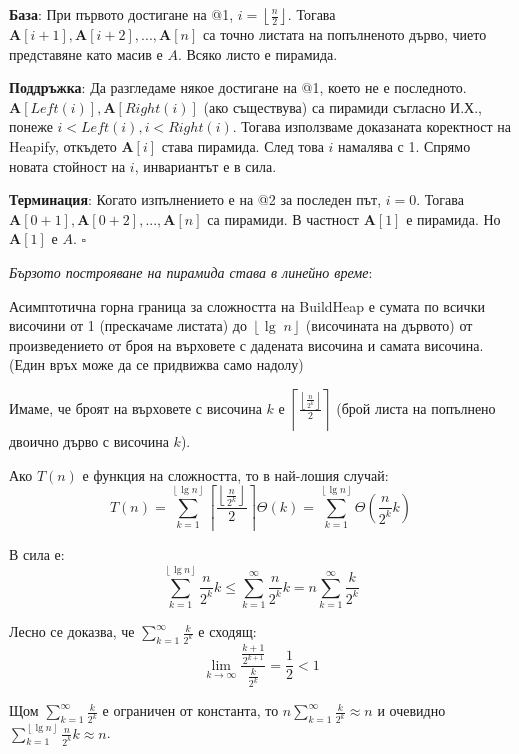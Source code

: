 \documentclass{article}
\renewcommand{\\}{\newline}
\newcommand{\proven}{\hfill $\square$}
\begin{document}
\textbf{База}: При първото достигане на @1, \(i = \left\lfloor \frac{n}{2}\right\rfloor\). Тогава \(\textbf{A}[i + 1], \textbf{A}[i+2], ..., \textbf{A}[n]\)  са точно листата на попълненото дърво, чието представяне като масив е \(A\). Всяко листо е пирамида.

\textbf{Поддръжка}: Да разгледаме някое достигане на @1, което не е последното. \(\textbf{A}[Left(i)], \textbf{A}[Right(i)]\) (ако съществува) са пирамиди съгласно И.Х., понеже \(i < Left(i), i < Right(i)\). Тогава използваме доказаната коректност на Heapify, откъдето \(\textbf{A}[i]\) става пирамида. След това \(i\) намалява с 1. Спрямо новата стойност на \(i\), инвариантът е в сила.

\textbf{Терминация}: Когато изпълнението е на @2 за последен път, \(i = 0\). Тогава \(\textbf{A}[0+1], \textbf{A}[0 + 2], ..., \textbf{A}[n]\) са пирамиди. В частност \(\textbf{A}[1]\) е пирамида. Но \(\textbf{A}[1]\) е \(A\). \proven

\textit{Бързото построяване на пирамида става в линейно време}: 

Асимптотична горна граница за сложността на BuildHeap е сумата по всички височини от 1 (прескачаме листата) до \(\left\lfloor \lg\;n\right\rfloor\) (височината на дървото) от произведението от броя на върховете с дадената височина и самата височина. (Един връх може да се придвижва само надолу)

Имаме, че броят на върховете с височина \(k\) е \(\left\lceil \frac{\left\lfloor \frac{n}{2^{k}}\right\rfloor}{2}\right\rceil\) (брой листа на попълнено двоично дърво с височина \(k\)). 

Ако \(T(n)\) е функция на сложността, то в най-лошия случай: \[
  T(n) = \sum_{k = 1}^{\left\lfloor \lg n\right\rfloor}\left\lceil \frac{\left\lfloor \frac{n}{2^{k}}\right\rfloor}{2}\right\rceil \Theta(k) = \sum_{k = 1}^{\left\lfloor \lg n\right\rfloor}\Theta \left(\frac{n}{2^{k}}k\right)
\]  

В сила е: \[
  \sum_{k=1}^{\left\lfloor \lg n\right\rfloor} \frac{n }{2^{k}}k \leq \sum_{k=1}^{\infty}\frac{n}{2^{k}}k = n\sum_{k = 1}^{\infty}\frac{k}{2^{k}}
\] 

Лесно се доказва, че \(\sum_{k=1}^{\infty}\frac{k}{2^{k}}\) е сходящ: \[
 \underset{k \to \infty}{\lim} \frac{\frac{k+1}{2^{k+1}}}{\frac{k}{2^{k}}} = \frac{1}{2} < 1 
\]  

Щом \(\sum_{k=1}^{\infty}\frac{k}{2^{k}}\) е ограничен от константа, то \(n\sum_{k=1}^{\infty}\frac{k}{2^{k}} \approx n\) и очевидно \(\sum_{k=1}^{\left\lfloor \lg n\right\rfloor} \frac{n}{2^{k}}k \approx n\).
\end{document}
